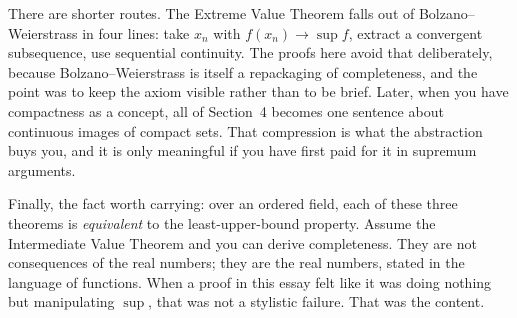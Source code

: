 \documentclass{essay}
\begin{document}
There are shorter routes. The Extreme Value Theorem falls out of Bolzano--Weierstrass in four lines: take \(x_{n}\) with \(f(x_{n}) \to \sup f\), extract a convergent subsequence, use sequential continuity. The proofs here avoid that deliberately, because Bolzano--Weierstrass is itself a repackaging of completeness, and the point was to keep the axiom visible rather than to be brief. Later, when you have compactness as a concept, all of Section~4 becomes one sentence about continuous images of compact sets. That compression is what the abstraction buys you, and it is only meaningful if you have first paid for it in supremum arguments.

Finally, the fact worth carrying: over an ordered field, each of these three theorems is \emph{equivalent} to the least-upper-bound property. Assume the Intermediate Value Theorem and you can derive completeness. They are not consequences of the real numbers; they are the real numbers, stated in the language of functions. When a proof in this essay felt like it was doing nothing but manipulating \(\sup\), that was not a stylistic failure. That was the content.
\end{document}
